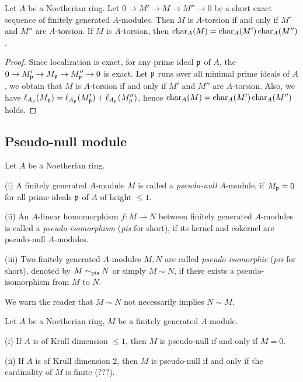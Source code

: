 \begin{prop}
\label{char-ideal-additive}
Let $A$ be a Noetherian ring.
Let $0\to M'\to M\to M''\to 0$ be a short exact sequence of finitely generated $A$-modules. Then $M$ is $A$-torsion if and only if $M'$ and $M''$ are $A$-torsion.
If $M$ is $A$-torsion, then $\operatorname{char}_A(M)=\operatorname{char}_A(M')\operatorname{char}_A(M'')$.
\end{prop}

\begin{proof}
Since localization is exact, for any prime ideal ${\mathfrak{p}}$ of $A$,
the $0\to M_{\mathfrak{p}}'\to M_{\mathfrak{p}}\to M_{\mathfrak{p}}''\to 0$ is exact.
Let ${\mathfrak{p}}$ runs over all minimal prime ideals of $A$,
we obtain that $M$ is $A$-torsion if and only if $M'$ and $M''$ are $A$-torsion.
Also, we have $\ell_{A_{\mathfrak{p}}}(M_{\mathfrak{p}})=\ell_{A_{\mathfrak{p}}}(M_{\mathfrak{p}}')+\ell_{A_{\mathfrak{p}}}(M_{\mathfrak{p}}'')$,
hence $\operatorname{char}_A(M)=\operatorname{char}_A(M')\operatorname{char}_A(M'')$ holds.
\end{proof}

\subsection{Pseudo-null module}

\begin{definition}
\label{pseudo-null}
\leanok
Let $A$ be a Noetherian ring.

{\rm(i)}
A finitely generated $A$-module $M$ is called a \emph{pseudo-null} $A$-module,
if $M_{\mathfrak{p}}=0$ for all prime ideals ${\mathfrak{p}}$ of $A$ of height $\leq 1$.

{\rm(ii)}
An $A$-linear homomorphism $f:M\to N$ between finitely generated $A$-modules
is called a \emph{pseudo-isomorphism} (\emph{pis} for short),
if its kernel and cokernel are pseudo-null $A$-modules.

{\rm(iii)}
Two finitely generated $A$-modules $M,N$ are called
\emph{pseudo-isomorphic} (\emph{pis} for short),
denoted by $M\sim_{\mathrm{pis}} N$ or simply $M\sim N$,
if there exists a pseudo-isomorphism from $M$ to $N$.
\end{definition}

\begin{remark}
We warn the reader that $M\sim N$ not necessarily implies $N\sim M$.
\end{remark}

\begin{prop}
\label{pseudo-null-criterion}
Let $A$ be a Noetherian ring, $M$ be a finitely generated $A$-module.

{\rm(i)} If $A$ is of Krull dimension $\leq 1$, then $M$ is pseudo-null
if and only if $M=0$.

{\rm(ii)} If $A$ is of Krull dimension $2$, then $M$ is pseudo-null
if and only if the cardinality of $M$ is finite (???).
\end{prop}

